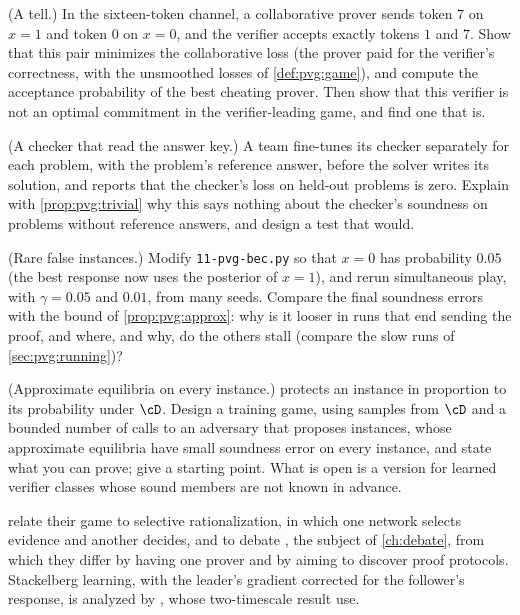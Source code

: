 \begin{refsection}
\begin{exercises}
\item \attack (A tell.) In the sixteen-token channel, a collaborative prover sends token $7$ on $x=1$ and token $0$ on $x=0$, and the verifier accepts exactly tokens $1$ and $7$. Show that this pair minimizes the collaborative loss (the prover paid for the verifier's correctness, with the unsmoothed losses of \cref{def:pvg:game}), and compute the acceptance probability of the best cheating prover. Then show that this verifier is not an optimal commitment in the verifier-leading game, and find one that is.\label{ex:pvg:tell}

\item \attack (A checker that read the answer key.) A team fine-tunes its checker separately for each problem, with the problem's reference answer, before the solver writes its solution, and reports that the checker's loss on held-out problems is zero. Explain with \cref{prop:pvg:trivial} why this says nothing about the checker's soundness on problems without reference answers, and design a test that would.\label{ex:pvg:key}

\item \simulation (Rare false instances.) Modify \texttt{11-pvg-bec.py} so that $x=0$ has probability $0.05$ (the best response now uses the posterior of $x=1$), and rerun simultaneous play, with $\gamma=0.05$ and $0.01$, from many seeds. Compare the final soundness errors with the bound of \cref{prop:pvg:approx}: why is it looser in runs that end sending the proof, and where, and why, do the others stall (compare the slow runs of \cref{sec:pvg:running})?\label{ex:pvg:rare}

\item \research (Approximate equilibria on every instance.)  protects an instance in proportion to its probability under $\cD$. Design a training game, using samples from $\cD$ and a bounded number of calls to an adversary that proposes instances, whose approximate equilibria have small soundness error on every instance, and state what you can prove; \textcite[Propositions~9 and~10]{HammondAdamDay2025} give a starting point. What is open is a version for learned verifier classes whose sound members are not known in advance.\label{ex:pvg:robust}
\end{exercises}

\notesandrefs
\Textcite{AnilEtAl2021} relate their game to selective rationalization, in which one network selects evidence and another decides, and to debate \parencite{IrvingEtAl2018}, the subject of \cref{ch:debate}, from which they differ by having one prover and by aiming to discover proof protocols. Stackelberg learning, with the leader's gradient corrected for the follower's response, is analyzed by \textcite{FiezChasnovRatliff2020}, whose two-timescale result \textcite{HammondAdamDay2025} use.


\end{refsection}
